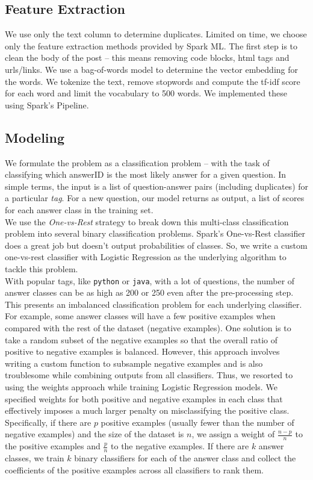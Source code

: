\documentclass{article}
\begin{document}
\subsection{Feature Extraction}
We use only the text column to determine duplicates. Limited on time, we choose only the feature extraction methods provided by Spark ML. The first step is to clean the body of the post -- this means removing code blocks, html tags and urls/links. We use a bag-of-words model to determine the vector embedding for the words. We tokenize the text, remove stopwords and compute the tf-idf score for each word and limit the vocabulary to 500 words. We implemented these using Spark's Pipeline.

\subsection{Modeling}
We formulate the problem as a classification problem -- with the task of classifying which answerID is the most likely answer for a given question. In simple terms, the input is a list of question-answer pairs (including duplicates) for a particular \textit{tag}. For a new question, our model returns as output, a list of scores for each answer class in the training set.\\

We use the \textit{One-vs-Rest} strategy to break down this multi-class classification problem into several binary classification problems. Spark's One-vs-Rest classifier does a great job but doesn't output probabilities of classes. So, we write a custom one-vs-rest classifier with Logistic Regression as the underlying algorithm to tackle this problem.\\

With popular tags, like \texttt{python} or \texttt{java}, with a lot of questions, the number of answer classes can be as high as 200 or 250 even after the pre-processing step. This presents an imbalanced classification problem for each underlying classifier. For example, some answer classes will have a few positive examples when compared with the rest of the dataset (negative examples). One solution is to take a random subset of the negative examples so that the overall ratio of positive to negative examples is balanced. However, this approach involves writing a custom function to subsample negative examples and is also troublesome while combining outputs from all classifiers. Thus, we resorted to using the weights approach while training Logistic Regression models. We specified weights for both positive and negative examples in each class that effectively imposes a much larger penalty on misclassifying the positive class. Specifically, if there are $p$ positive examples (usually fewer than the number of negative examples) and the size of the dataset is $n$, we assign a weight of $\frac{n-p}{n}$ to the positive examples and $\frac{p}{n}$ to the negative examples. If there are $k$ answer classes, we train $k$ binary classifiers for each of the answer class and collect the coefficients of the positive examples across all classifiers to rank them.
\end{document}
